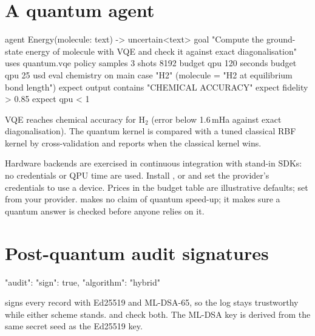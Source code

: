 \section{A quantum agent}

\begin{algo}[title=enterprise-apps/quantum-ai-lab/programs/quantum\_ai.algo (excerpt)]
agent Energy(molecule: text) -> uncertain<text> {
    goal   "Compute the ground-state energy of {molecule} with VQE and check it against exact diagonalisation"
    uses   quantum.vqe
    policy { samples 3  shots 8192  budget qpu 120 seconds  budget qpu 25 usd }
}
eval chemistry on main {
    case "H2" (molecule = "H2 at equilibrium bond length") {
        expect output contains "CHEMICAL ACCURACY"
        expect fidelity > 0.85
        expect qpu < 1
    }
}
\end{algo}

VQE reaches chemical accuracy for H$_2$ (error below 1.6\,mHa against exact diagonalisation). The quantum kernel is compared with a tuned classical RBF kernel by cross-validation and reports  when the classical kernel wins.

\begin{caution}
Hardware backends are exercised in continuous integration with stand-in SDKs: no credentials or QPU time are used. Install , \code{[braket]} or \code{[azure]} and set the provider's credentials to use a device. Prices in the budget table are illustrative defaults; set  from your provider. \algolang{} makes no claim of quantum speed-up; it makes sure a quantum answer is checked before anyone relies on it.
\end{caution}

\section{Post-quantum audit signatures}

\begin{plaincode}[title=algo.config.json]
"audit": {"sign": true, "algorithm": "hybrid"}
\end{plaincode}

 signs every record with Ed25519 and ML-DSA-65, so the log stays trustworthy while either scheme stands.  and  check both. The ML-DSA key is derived from the same secret seed as the Ed25519 key.
